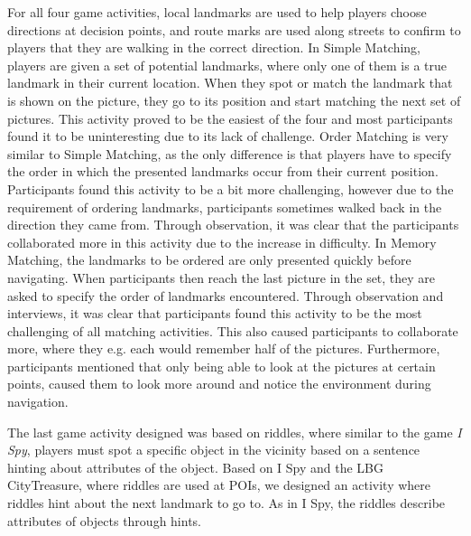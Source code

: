 For all four game activities, local landmarks are used to help players choose directions at decision points, and route marks are used along streets to confirm to players that they are walking in the correct direction. In Simple Matching, players are given a set of potential landmarks, where only one of them is a true landmark in their current location. When they spot or match the landmark that is shown on the picture, they go to its position and start matching the next set of pictures. This activity proved to be the easiest of the four and most participants found it to be uninteresting due to its lack of challenge. Order Matching is very similar to Simple Matching, as the only difference is that players have to specify the order in which the presented landmarks occur from their current position. Participants found this activity to be a bit more challenging, however due to the requirement of ordering landmarks, participants sometimes walked back in the direction they came from. Through observation, it was clear that the participants collaborated more in this activity due to the increase in difficulty. In Memory Matching, the landmarks to be ordered are only presented quickly before navigating. When participants then reach the last picture in the set, they are asked to specify the order of landmarks encountered. Through observation and interviews, it was clear that participants found this activity to be the most challenging of all matching activities. This also caused participants to collaborate more, where they e.g. each would remember half of the pictures. Furthermore, participants mentioned that only being able to look at the pictures at certain points, caused them to look more around and notice the environment during navigation.

The last game activity designed was based on riddles, where similar to the game \textit{I Spy}\cite{childrensGames}, players must spot a specific object in the vicinity based on a sentence hinting about attributes of the object. Based on I Spy and the LBG CityTreasure, where riddles are used at POIs, we designed an activity where riddles hint about the next landmark to go to. As in I Spy, the riddles describe attributes of objects through hints.

